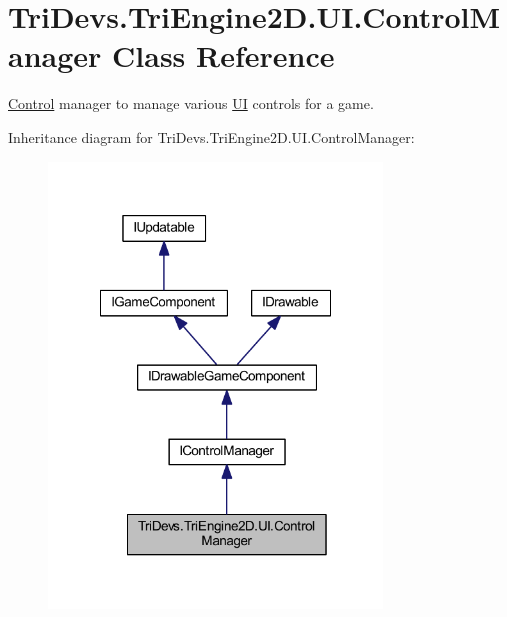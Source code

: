\hypertarget{class_tri_devs_1_1_tri_engine2_d_1_1_u_i_1_1_control_manager}{\section{Tri\-Devs.\-Tri\-Engine2\-D.\-U\-I.\-Control\-Manager Class Reference}
\label{class_tri_devs_1_1_tri_engine2_d_1_1_u_i_1_1_control_manager}
}


\hyperlink{class_tri_devs_1_1_tri_engine2_d_1_1_u_i_1_1_control}{Control} manager to manage various \hyperlink{namespace_tri_devs_1_1_tri_engine2_d_1_1_u_i}{U\-I} controls for a game.  




Inheritance diagram for Tri\-Devs.\-Tri\-Engine2\-D.\-U\-I.\-Control\-Manager\-:\nopagebreak
\begin{figure}[H]
\begin{center}
\leavevmode
\includegraphics[width=251pt]{class_tri_devs_1_1_tri_engine2_d_1_1_u_i_1_1_control_manager__inherit__graph}
\end{center}
\end{figure}


